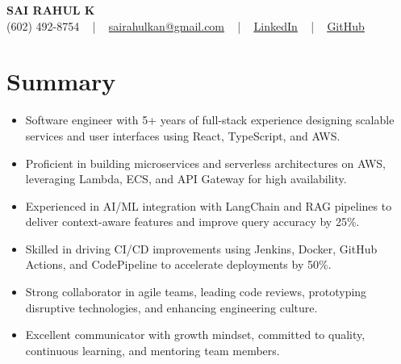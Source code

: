 \documentclass[letterpaper,11pt]{article}
\newcommand{\resumeItem}[1]{
  \item\footnotesize{
    {#1 \vspace{-2pt}}
  }
}
\newcommand{\resumeItemListStart}{\begin{itemize}[leftmargin=*]}
\newcommand{\resumeItemListEnd}{\end{itemize}\vspace{-5pt}}
\begin{document}
\begin{center}
    {\fontsize{14pt}{12pt}\selectfont \textbf{\MakeUppercase{Sai Rahul K}}}\\ \vspace{2pt}
    \fontsize{10pt}{12pt}\selectfont (602) 492-8754 ~ | ~ \href{mailto:sairahulkan@gmail.com}{sairahulkan@gmail.com} ~ | ~
    \href{https://www.linkedin.com/in/rq123/}{\color{blue}\underline{LinkedIn}} ~ | ~
    \href{https://github.com/kanrahuldo}{\color{blue}\underline{GitHub}}~
    \vspace{-8pt}
\end{center}

\section{Summary}
\fontsize{9pt}{10pt}\selectfont
\resumeItemListStart
    \resumeItem{Software engineer with 5+ years of full-stack experience designing scalable services and user interfaces using React, TypeScript, and AWS.}
    \resumeItem{Proficient in building microservices and serverless architectures on AWS, leveraging Lambda, ECS, and API Gateway for high availability.}
    \resumeItem{Experienced in AI/ML integration with LangChain and RAG pipelines to deliver context-aware features and improve query accuracy by 25\%.}
    \resumeItem{Skilled in driving CI/CD improvements using Jenkins, Docker, GitHub Actions, and CodePipeline to accelerate deployments by 50\%.}
    \resumeItem{Strong collaborator in agile teams, leading code reviews, prototyping disruptive technologies, and enhancing engineering culture.}
    \resumeItem{Excellent communicator with growth mindset, committed to quality, continuous learning, and mentoring team members.}
\resumeItemListEnd
\vspace{-6pt}
\end{document}
